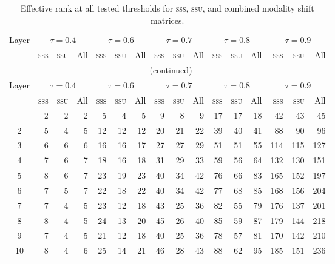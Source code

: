 \documentclass{article}
\newcommand{\ssu}{\textsc{ssu}}
\newcommand{\sss}{\textsc{sss}}
\begin{document}
\begin{longtable}{c *{3}{r} *{3}{r} *{3}{r} *{3}{r} *{3}{r}}
\caption{Effective rank at all tested thresholds for \sss{}, \ssu{}, and combined
         modality shift matrices.}
\label{tab:eff_rank_full}\\
\toprule
Layer
  & \multicolumn{3}{c}{$\tau{=}0.4$}
  & \multicolumn{3}{c}{$\tau{=}0.6$}
  & \multicolumn{3}{c}{$\tau{=}0.7$}
  & \multicolumn{3}{c}{$\tau{=}0.8$}
  & \multicolumn{3}{c}{$\tau{=}0.9$} \\
\cmidrule(lr){2-4}\cmidrule(lr){5-7}\cmidrule(lr){8-10}%
\cmidrule(lr){11-13}\cmidrule(lr){14-16}
  & \sss & \ssu & All
  & \sss & \ssu & All
  & \sss & \ssu & All
  & \sss & \ssu & All
  & \sss & \ssu & All \\
\midrule
\endfirsthead
\multicolumn{16}{c}{\tablename\ \thetable{} (continued)} \\
\toprule
Layer
  & \multicolumn{3}{c}{$\tau{=}0.4$}
  & \multicolumn{3}{c}{$\tau{=}0.6$}
  & \multicolumn{3}{c}{$\tau{=}0.7$}
  & \multicolumn{3}{c}{$\tau{=}0.8$}
  & \multicolumn{3}{c}{$\tau{=}0.9$} \\
\cmidrule(lr){2-4}\cmidrule(lr){5-7}\cmidrule(lr){8-10}%
\cmidrule(lr){11-13}\cmidrule(lr){14-16}
  & \sss & \ssu & All & \sss & \ssu & All & \sss & \ssu & All
  & \sss & \ssu & All & \sss & \ssu & All \\
\midrule
\endhead
\bottomrule
\endlastfoot
 1 &  2 &  2 &  2 &  5 &  4 &  5 &  9 &  8 &  9 & 17 & 17 & 18 &  42 &  43 &  45 \\
 2 &  5 &  4 &  5 & 12 & 12 & 12 & 20 & 21 & 22 & 39 & 40 & 41 &  88 &  90 &  96 \\
 3 &  6 &  6 &  6 & 16 & 16 & 17 & 27 & 27 & 29 & 51 & 51 & 55 & 114 & 115 & 127 \\
 4 &  7 &  6 &  7 & 18 & 16 & 18 & 31 & 29 & 33 & 59 & 56 & 64 & 132 & 130 & 151 \\
 5 &  8 &  6 &  7 & 23 & 19 & 23 & 40 & 34 & 42 & 76 & 66 & 83 & 165 & 152 & 197 \\
 6 &  7 &  5 &  7 & 22 & 18 & 22 & 40 & 34 & 42 & 77 & 68 & 85 & 168 & 156 & 204 \\
 7 &  7 &  4 &  5 & 23 & 12 & 18 & 43 & 25 & 36 & 82 & 55 & 79 & 176 & 137 & 201 \\
 8 &  8 &  4 &  5 & 24 & 13 & 20 & 45 & 26 & 40 & 85 & 59 & 87 & 179 & 144 & 218 \\
 9 &  7 &  4 &  5 & 21 & 12 & 18 & 40 & 25 & 36 & 78 & 57 & 81 & 170 & 142 & 210 \\
10 &  8 &  4 &  6 & 25 & 14 & 21 & 46 & 28 & 43 & 88 & 62 & 95 & 185 & 151 & 236 \\

\end{longtable}
\end{document}
